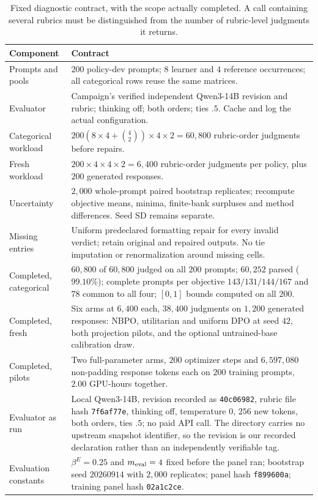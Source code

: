 \documentclass{article}
\theoremstyle{remark}
\theoremstyle{plain}
\newcommand{\NBPO}{\textsc{NBPO}}
\begin{document}
\begin{table}[htbp]
\centering\small
\caption{Fixed diagnostic contract, with the scope actually completed. A call containing several rubrics must be distinguished from the number of rubric-level judgments it returns.}
\label{tab:diagnostic-contract}
\begin{tabular}{p{.27\linewidth}p{.65\linewidth}}
\toprule
Component & Contract\\
\midrule
Prompts and pools & $200$ policy-dev prompts; $8$ learner and $4$ reference occurrences; all categorical rows reuse the same matrices.\\
Evaluator & Campaign's verified independent Qwen3-14B revision and rubric; thinking off; both orders; ties $.5$. Cache and log the actual configuration.\\
Categorical workload & $200(8\times4+\binom42)\times4\times2=60{,}800$ rubric-order judgments before repairs.\\
Fresh workload & $200\times4\times4\times2=6{,}400$ rubric-order judgments per policy, plus $200$ generated responses.\\
Uncertainty & $2{,}000$ whole-prompt paired bootstrap replicates; recompute objective means, minima, finite-bank surpluses and method differences. Seed SD remains separate.\\
Missing entries & Uniform predeclared formatting repair for every invalid verdict; retain original and repaired outputs. No tie imputation or renormalization around missing cells.\\
\midrule
Completed, categorical & $60{,}800$ of $60{,}800$ judged on all $200$ prompts; $60{,}252$ parsed ($99.10\%$); complete prompts per objective $143/131/144/167$ and $78$ common to all four; $[0,1]$ bounds computed on all $200$.\\
Completed, fresh & Six arms at $6{,}400$ each, $38{,}400$ judgments on $1{,}200$ generated responses: \NBPO{}, utilitarian and uniform DPO at seed $42$, both projection pilots, and the optional untrained-base calibration draw.\\
Completed, pilots & Two full-parameter arms, $200$ optimizer steps and $6{,}597{,}080$ non-padding response tokens each on $200$ training prompts, $2.00$ GPU-hours together.\\
Evaluator as run & Local Qwen3-14B, revision recorded as \texttt{40c06982}, rubric file hash \texttt{7f6af77e}, thinking off, temperature $0$, $256$ new tokens, both orders, ties $.5$; no paid API call. The directory carries no upstream snapshot identifier, so the revision is our recorded declaration rather than an independently verifiable tag.\\
Evaluation constants & $\beta^E=0.25$ and $m_{\rm eval}=4$ fixed before the panel ran; bootstrap seed $20260914$ with $2{,}000$ replicates; panel hash \texttt{f899600a}; training panel hash \texttt{02a1c2ce}.\\
\bottomrule
\end{tabular}
\end{table}
\end{document}
